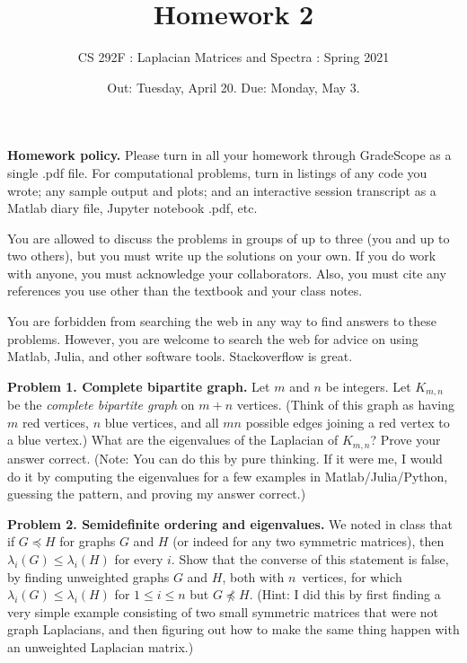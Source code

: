 \documentclass[11pt]{article}
\begin{document}

\title{Homework 2}
\author{CS 292F : Laplacian Matrices and Spectra : Spring 2021}

\date{Out: Tuesday, April 20. Due: Monday, May 3.}
\maketitle

{\bf Homework policy.} 
Please turn in all your homework through GradeScope as a single .pdf file.
For computational problems, turn in listings of any code you wrote; 
any sample output and plots; and an interactive session transcript as
a Matlab diary file, Jupyter notebook .pdf, etc.

You are allowed to discuss the problems in groups of up to three 
(you and up to two others), but you must write up the solutions 
on your own. If you do work with anyone, you must acknowledge your
collaborators. Also, you must cite any references you use other than
the textbook and your class notes.

You are forbidden from searching the web in any way to find answers
to these problems. However, you are welcome to search the web for
advice on using Matlab, Julia, and other software tools. Stackoverflow
is great.

\par\bigskip
{\bf Problem 1. Complete bipartite graph.}
Let $m$ and $n$ be integers.  
Let $K_{m,n}$ be the {\em complete bipartite graph} on $m+n$ vertices. 
(Think of this graph as having $m$ red vertices, $n$ blue vertices,
and all $mn$ possible edges joining a red vertex to a blue vertex.)
What are the eigenvalues of the Laplacian of $K_{m,n}$?
Prove your answer correct.
(Note: You can do this by pure thinking. If it were me, I would do it
by computing the eigenvalues for a few examples in Matlab/Julia/Python, 
guessing the pattern, and proving my answer correct.)

\par\bigskip
{\bf Problem 2. Semidefinite ordering and eigenvalues.} 
We noted in class that if $G\preceq H$ for graphs $G$ and $H$
(or indeed for any two symmetric matrices),
then $\lambda_i(G)\le\lambda_i(H)$ for every $i$.
Show that the converse of this statement is false, 
by finding unweighted graphs $G$ and $H$, both with 
$n$~vertices, for which $\lambda_i(G)\le\lambda_i(H)$ for $1\le i\le n$
but $G\not\preceq H$.
(Hint: I did this by first finding a very simple example consisting
of two small symmetric matrices that were not graph Laplacians,
and then figuring out how to make the same thing happen with an
unweighted Laplacian matrix.)
\end{document}
